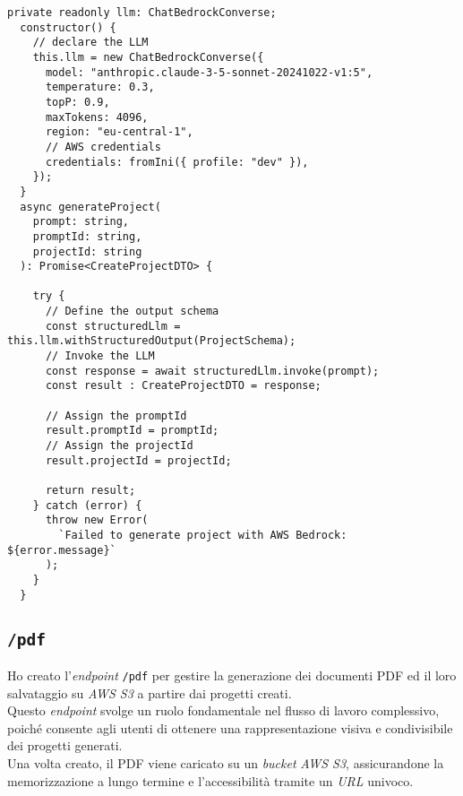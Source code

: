 \begin{lstlisting}[caption={Dichiarazione \gls{llm} e sua invocazione}, label={lst:funzione-generazione-progetto}]
private readonly llm: ChatBedrockConverse;
  constructor() {  
    // declare the LLM
    this.llm = new ChatBedrockConverse({
      model: "anthropic.claude-3-5-sonnet-20241022-v1:5",
      temperature: 0.3,
      topP: 0.9,
      maxTokens: 4096,
      region: "eu-central-1",
      // AWS credentials
      credentials: fromIni({ profile: "dev" }), 
    });
  }
  async generateProject(
    prompt: string,
    promptId: string,
    projectId: string
  ): Promise<CreateProjectDTO> {

    try {
      // Define the output schema
      const structuredLlm = this.llm.withStructuredOutput(ProjectSchema); 
      // Invoke the LLM
      const response = await structuredLlm.invoke(prompt); 
      const result : CreateProjectDTO = response;

      // Assign the promptId
      result.promptId = promptId; 
      // Assign the projectId
      result.projectId = projectId; 

      return result;
    } catch (error) {
      throw new Error(
        `Failed to generate project with AWS Bedrock: ${error.message}`
      );
    }
  }
\end{lstlisting}
\pagebreak
\subsection*{\texttt{/pdf}}
Ho creato l'\textit{endpoint} \texttt{/pdf} per gestire la generazione dei documenti PDF ed il loro salvataggio su \textit{AWS S3} a partire dai progetti creati.\\
Questo \textit{endpoint} svolge un ruolo fondamentale nel flusso di lavoro complessivo, poiché consente agli utenti di ottenere una rappresentazione visiva e condivisibile dei progetti generati.\\
Una volta creato, il PDF viene caricato su un \textit{bucket} \textit{AWS S3}, assicurandone la memorizzazione a lungo termine e l’accessibilità tramite un \textit{URL} univoco.\\ 


